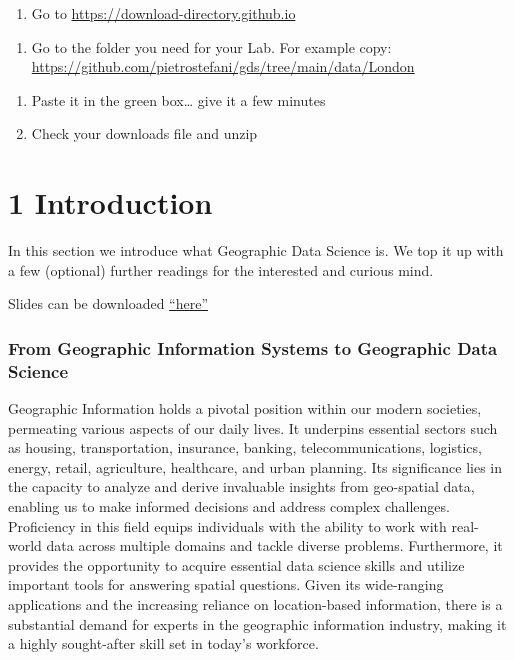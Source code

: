 \documentclass[
  letterpaper,
  DIV=11,
  numbers=noendperiod]{scrreprt}
\providecommand{\tightlist}{%
  \setlength{\itemsep}{0pt}\setlength{\parskip}{0pt}}\usepackage{longtable,booktabs,array}
\begin{document}
\begin{enumerate}
\def\labelenumi{\arabic{enumi}.}
\tightlist
\item
  Go to \url{https://download-directory.github.io}
\end{enumerate}

\begin{enumerate}
\def\labelenumi{\arabic{enumi}.}
\setcounter{enumi}{1}
\tightlist
\item
  Go to the folder you need for your Lab. For example copy:
  \url{https://github.com/pietrostefani/gds/tree/main/data/London}
\end{enumerate}

\begin{enumerate}
\def\labelenumi{\arabic{enumi}.}
\setcounter{enumi}{2}
\item
  Paste it in the green box\ldots{} give it a few minutes
\item
  Check your downloads file and unzip
\end{enumerate}

\part{1 Introduction}

In this section we introduce what Geographic Data Science is. We top it
up with a few (optional) further readings for the interested and curious
mind.

Slides can be downloaded \href{./html/introduction_gds.pdf}{``here''}

\section*{From Geographic Information Systems to Geographic Data
Science}\label{from-geographic-information-systems-to-geographic-data-science}


Geographic Information holds a pivotal position within our modern
societies, permeating various aspects of our daily lives. It underpins
essential sectors such as housing, transportation, insurance, banking,
telecommunications, logistics, energy, retail, agriculture, healthcare,
and urban planning. Its significance lies in the capacity to analyze and
derive invaluable insights from geo-spatial data, enabling us to make
informed decisions and address complex challenges. Proficiency in this
field equips individuals with the ability to work with real-world data
across multiple domains and tackle diverse problems. Furthermore, it
provides the opportunity to acquire essential data science skills and
utilize important tools for answering spatial questions. Given its
wide-ranging applications and the increasing reliance on location-based
information, there is a substantial demand for experts in the geographic
information industry, making it a highly sought-after skill set in
today's workforce.
\end{document}
